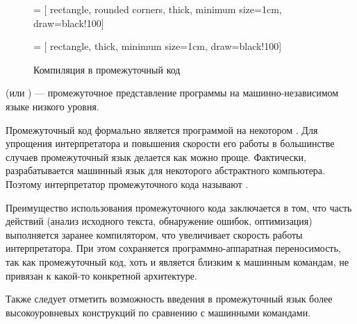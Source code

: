 \begin{figure}
  \begin{centering}
     = [
      rectangle,
      rounded corners,
      thick,
      minimum size=1cm,
      draw=black!100]
    
     = [
      rectangle,
      thick,
      minimum size=1cm,
      draw=black!100]
    
    \par
  \end{centering}
  
  \caption{Компиляция в промежуточный код\label{fig:pcode}}
\end{figure}

\begin{defn}
   (или
  ) — промежуточное представление программы
  на машинно-независимом языке низкого уровня.
\end{defn}

Промежуточный код формально является программой на некотором
. Для упрощения
интерпретатора и повышения скорости его работы в большинстве случаев
промежуточный язык делается как можно проще.  Фактически,
разрабатывается машинный язык для некоторого абстрактного
компьютера. Поэтому интерпретатор промежуточного кода называют
.

Преимущество использования промежуточного кода заключается в том, что
часть действий (анализ исходного текста, обнаружение ошибок,
оптимизация) выполняется заранее компилятором, что увеличивает
скорость работы интерпретатора. При этом сохраняется
программно-аппаратная переносимость, так как промежуточный код, хоть и
является близким к машинным командам, не привязан к какой-то
конкретной архитектуре.

Также следует отметить возможность введения в промежуточный язык более
высокоуровневых конструкций по сравнению с машинными командами.

